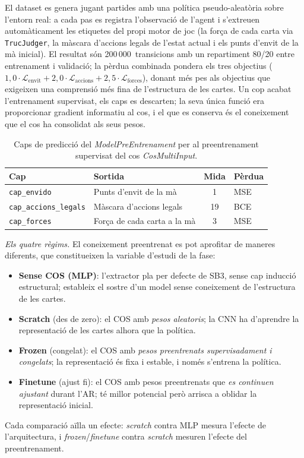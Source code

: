 El dataset es genera jugant partides amb una política pseudo-aleatòria sobre l'entorn
real: a cada pas es registra l'observació de l'agent i s'extreuen automàticament les
etiquetes del propi motor de joc (la força de cada carta via \texttt{TrucJudger}, la
màscara d'accions legals de l'estat actual i els punts d'envit de la mà inicial). El
resultat són 200\,000~transicions amb un repartiment 80/20 entre entrenament i validació;
la pèrdua combinada pondera els tres objectius
(\(1{,}0\cdot\mathcal{L}_{\text{envit}} + 2{,}0\cdot\mathcal{L}_{\text{accions}} +
2{,}5\cdot\mathcal{L}_{\text{forces}}\)), donant més pes als objectius que exigeixen una
comprensió més fina de l'estructura de les cartes. Un cop acabat l'entrenament supervisat,
els caps es descarten; la seva única funció era proporcionar gradient informatiu al cos,
i el que es conserva és el coneixement que el cos ha consolidat als seus pesos.

\begin{table}[H]
  \centering
  \begin{tabular}{llcl}
    \toprule
    Cap & Sortida & Mida & Pèrdua \\
    \midrule
    \texttt{cap\_envido}          & Punts d'envit de la mà      & 1  & MSE \\
    \texttt{cap\_accions\_legals} & Màscara d'accions legals    & 19 & BCE \\
    \texttt{cap\_forces}          & Força de cada carta a la mà & 3  & MSE \\
    \bottomrule
  \end{tabular}
  \caption{Caps de predicció del \emph{ModelPreEntrenament} per al preentrenament
           supervisat del cos \emph{CosMultiInput}.}
  \label{tab:caps-preentrenament}
\end{table}

\emph{Els quatre règims.} El coneixement preentrenat es pot aprofitar de maneres
diferents, que constitueixen la variable d'estudi de la fase:
\begin{itemize}
  \item \textbf{Sense COS (MLP)}: l'extractor pla per defecte de \ac{SB3}, sense cap
        inducció estructural; estableix el sostre d'un model sense coneixement de
        l'estructura de les cartes.
  \item \textbf{Scratch} (des de zero): el COS amb \emph{pesos aleatoris}; la \ac{CNN} ha
        d'aprendre la representació de les cartes alhora que la política.
  \item \textbf{Frozen} (congelat): el COS amb \emph{pesos preentrenats supervisadament i
        congelats}; la representació és fixa i estable, i només s'entrena la política.
  \item \textbf{Finetune} (ajust fi): el COS amb pesos preentrenats que \emph{es continuen
        ajustant} durant l'\ac{AR}; té millor potencial però arrisca a oblidar la
        representació inicial.
\end{itemize}
Cada comparació aïlla un efecte: \emph{scratch} contra \ac{MLP} mesura l'efecte de
l'arquitectura, i \emph{frozen}/\emph{finetune} contra \emph{scratch} mesuren l'efecte del
preentrenament.

